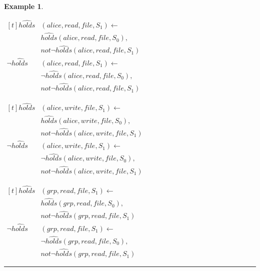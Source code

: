 \documentclass[10pt, twocolumn]{article}
\newtheorem{examp}{Example}
\newenvironment{example}{\begin{examp}\rm}{\rule{2mm}{2mm}\end{examp}}
\begin{document}
\begin{example}
\begin{enumerate}
              \begin{math}
                \begin{aligned}[t]
                  \hat{holds}&(alice, read, file, S_{1}) \leftarrow \\
                  & \hat{holds}(alice, read, file, S_{0}), \\
                  & not \lnot \hat{holds}(alice, read, file, S_{1}) \\
                  \lnot \hat{holds}&(alice, read, file, S_{1}) \leftarrow \\
                  & \lnot \hat{holds}(alice, read, file, S_{0}), \\
                  & not \lnot \hat{holds}(alice, read, file, S_{1})
                \end{aligned}
              \end{math}

              \begin{math}
                \begin{aligned}[t]
                  \hat{holds}&(alice, write, file, S_{1}) \leftarrow \\
                  & \hat{holds}(alice, write, file, S_{0}), \\
                  & not \lnot \hat{holds}(alice, write, file, S_{1}) \\
                  \lnot \hat{holds}&(alice, write, file, S_{1}) \leftarrow \\
                  & \lnot \hat{holds}(alice, write, file, S_{0}), \\
                  & not \lnot \hat{holds}(alice, write, file, S_{1})
                \end{aligned}
              \end{math}

              \begin{math}
                \begin{aligned}[t]
                  \hat{holds}&(grp, read, file, S_{1}) \leftarrow \\
                  & \hat{holds}(grp, read, file, S_{0}), \\
                  & not \lnot \hat{holds}(grp, read, file, S_{1}) \\
                  \lnot \hat{holds}&(grp, read, file, S_{1}) \leftarrow \\
                  & \lnot \hat{holds}(grp, read, file, S_{0}), \\
                  & not \lnot \hat{holds}(grp, read, file, S_{1})
                \end{aligned}
              \end{math}


\end{enumerate}
\end{example}
\end{document}
